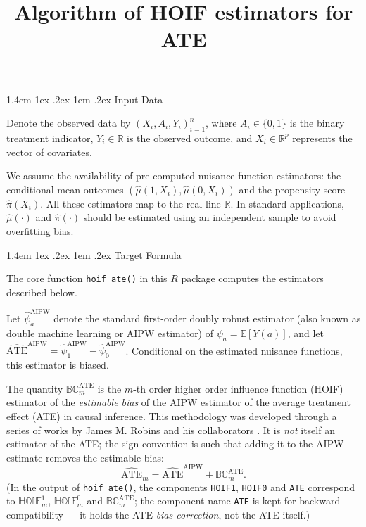 \documentclass[12pt]{article}
\title{\textbf{Algorithm of HOIF estimators for ATE}}
\author{}
\date{}
\makeatletter
\renewcommand{\section}{\@startsection{section}{1}{\z@}%
  {1.4em \@plus 1ex \@minus .2ex}%
  {1em \@plus .2ex}%
  {\normalfont\Large\bfseries}}
\makeatother
\begin{document}
\maketitle

\tableofcontents

\section{Input Data}

Denote the observed data by $(X_i, A_i, Y_i)_{i=1}^{n}$, where $A_i \in \{0, 1\}$ is the binary treatment indicator, $Y_i \in \mathbb{R}$ is the observed outcome, and $X_i \in \mathbb{R}^p$ represents the vector of covariates.

We assume the availability of pre-computed nuisance function estimators: the conditional mean outcomes $(\hat{\mu}(1, X_i), \hat{\mu}(0, X_i))$ and the propensity score $\hat{\pi}(X_i)$. All these estimators map to the real line $\mathbb{R}$. In standard applications, $\hat{\mu}(\cdot)$ and $\hat{\pi}(\cdot)$ should be estimated using an independent sample to avoid overfitting bias.

\section{Target Formula}

The core function \texttt{hoif\_ate()} in this $R$ package computes the estimators described below.

Let $\hat{\psi}^{\mathrm{AIPW}}_a$ denote the standard first-order doubly robust estimator (also known as double machine learning or AIPW estimator) of $\psi_a = \mathbb{E}[Y(a)]$, and let $\widehat{\mathrm{ATE}}^{\mathrm{AIPW}} = \hat{\psi}^{\mathrm{AIPW}}_1 - \hat{\psi}^{\mathrm{AIPW}}_0$. Conditional on the estimated nuisance functions, this estimator is biased.

The quantity $\mathbb{BC}^{\mathrm{ATE}}_m$ is the $m$-th order higher order influence function (HOIF) estimator of the \emph{estimable bias} of the AIPW estimator of the average treatment effect (ATE) in causal inference. This methodology was developed through a series of works by James M. Robins and his collaborators \cite{Robins2008_HOIF,Robins2017_Minimax,liu2017semiparametric,LiuLi2023_sHOIF}. It is \emph{not} itself an estimator of the ATE; the sign convention is such that adding it to the AIPW estimate removes the estimable bias:
\begin{equation*}
  \widehat{\mathrm{ATE}}_m = \widehat{\mathrm{ATE}}^{\mathrm{AIPW}} + \mathbb{BC}^{\mathrm{ATE}}_m.
\end{equation*}
(In the output of \texttt{hoif\_ate()}, the components \texttt{HOIF1}, \texttt{HOIF0} and \texttt{ATE} correspond to $\mathbb{HOIF}^1_m$, $\mathbb{HOIF}^0_m$ and $\mathbb{BC}^{\mathrm{ATE}}_m$; the component name \texttt{ATE} is kept for backward compatibility --- it holds the ATE \emph{bias correction}, not the ATE itself.)
\end{document}
